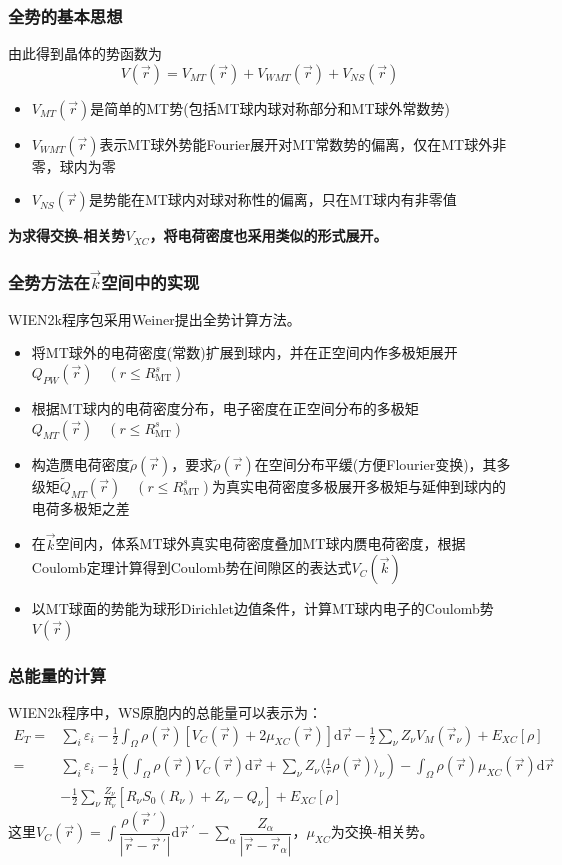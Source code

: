 \frame
{
\frametitle{全势的基本思想}
由此得到晶体的势函数为
$$ V(\vec r)=V_{MT}(\vec r)+V_{WMT}(\vec r)+V_{NS}(\vec r)
  \label{eq:solid-64}
$$
\begin{itemize}
	\item $V_{MT}(\vec r)$是简单的\textrm{MT}势(包括\textrm{MT}球内球对称部分和\textrm{MT}球外常数势)
	\item $V_{WMT}(\vec r)$表示\textrm{MT}球外势能\textrm{Fourier}展开对\textrm{MT}常数势的偏离，仅在\textrm{MT}球外非零，球内为零
	\item $V_{NS}(\vec r)$是势能在\textrm{MT}球内对球对称性的偏离，只在\textrm{MT}球内有非零值
\end{itemize}
\textbf{\large 为求得交换-相关势$V_{XC}$，将电荷密度也采用类似的形式展开。}
}
\frame
{
\frametitle{全势方法在$\vec k$空间中的实现}
\textrm{WIEN2k}程序包采用\textrm{Weiner}提出全势计算方法。
\begin{itemize}
	\item 将\textrm{MT}球外的电荷密度(常数)扩展到球内，并在正空间内作多极矩展开$Q_{PW}(\vec r)\quad(r\leqslant R_{\mathrm{MT}}^s)$
	\item 根据\textrm{MT}球内的电荷密度分布，电子密度在正空间分布的多极矩$Q_{MT}(\vec r)\quad(r\leqslant R_{\mathrm{MT}}^s)$
	\item 构造赝电荷密度$\tilde\rho(\vec r)$，要求$\tilde\rho(\vec r)$在空间分布平缓(方便\textrm{Flourier}变换)，其多级矩$\tilde Q_{MT}(\vec r)\quad(r\leqslant R_{\mathrm{MT}}^s)$为真实电荷密度多极展开多极矩与延伸到球内的电荷多极矩之差\\
	\item 在$\vec k$空间内，体系\textrm{MT}球外真实电荷密度叠加\textrm{MT}球内赝电荷密度，根据\textrm{Coulomb}定理计算得到\textrm{Coulomb}势在间隙区的表达式$V_C(\vec k)$
	\item 以\textrm{MT}球面的势能为球形\textrm{Dirichlet}边值条件，计算\textrm{MT}球内电子的\textrm{Coulomb}势$V(\vec r)$
\end{itemize}
}
\frame
{
\frametitle{总能量的计算}
\textrm{WIEN2k}程序中，\textrm{WS}原胞内的总能量可以表示为：
{\footnotesize
\begin{displaymath}
\begin{split}
E_T=&\sum_i\varepsilon_i-\frac12\int_{\Omega}\rho(\vec r)[V_C(\vec r)+2\mu_{XC}(\vec r)]\mathrm{d}\vec r-\frac12\sum_{\nu}Z_{\nu}V_M(\vec r_{\nu})+E_{XC}[\rho] \\
   =&\sum_i\varepsilon_i-\frac12\left(\int_{\Omega}\rho(\vec r)V_C(\vec r)\mathrm{d}\vec r+\sum_{\nu}Z_{\nu}\bigg\langle\frac1r\rho(\vec r)\bigg\rangle_{\nu}\right)-%
   \int_{\Omega}\rho(\vec r)\mu_{XC}(\vec r)\mathrm{d}\vec r \\
   &-\frac12\sum_{\nu}\frac{Z_{\nu}}{R_{\nu}}[R_{\nu}S_0(R_{\nu})+Z_{\nu}-Q_{\nu}]+E_{XC}[\rho]
\end{split}
\end{displaymath}
}
这里$V_C(\vec r)\!=\!\displaystyle\int\dfrac{\rho(\vec r\,^\prime)}{|\vec r-{\vec r}\,^\prime|}\mathrm{d}\vec r\,^\prime-\sum\limits_{\alpha}\dfrac{Z_{\alpha}}{|\vec r-\vec r_{\alpha}|}$，$\mu_{XC}$为交换-相关势。
}
